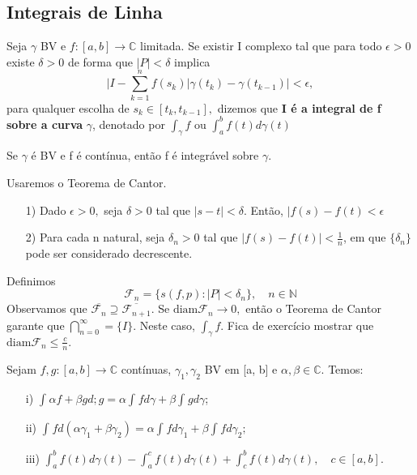 \documentclass[complex.tex]{subfiles}
\begin{document}
\subsection{Integrais de Linha}
\begin{def*}
	Seja $\gamma$ BV e $f:[a, b]\rightarrow \mathbb{C}$ limitada. Se existir I complexo tal que para todo $\epsilon > 0$ existe $\delta > 0$
	de forma que $|P| < \delta$ implica
	$$
		\biggl|I - \sum\limits_{k=1}^{n}f(s_{k})|\gamma(t_{k}) - \gamma(t_{k-1})\biggr| < \epsilon,
	$$
	para qualquer escolha de $s_{k}\in{[t_{k}, t_{k-1}]},$ dizemos que \textbf{I é a integral de f sobre a curva }$\gamma$, denotado por
	$\int_{\gamma}^{}f\text{ ou } \int_{a}^{b}f(t)d\gamma(t)$
\end{def*}
\begin{theorem*}
	Se $\gamma$ é BV e f é contínua, então f é integrável sobre $\gamma.$
\end{theorem*}
\begin{proof*}
	Usaremos o Teorema de Cantor.
	\begin{itemize}
		\item[1)] Dado $\epsilon > 0,$ seja $\delta > 0$ tal que $|s-t| < \delta.$ Então, $|f(s) - f(t) < \epsilon$
		\item[2)] Para cada n natural, seja $\delta_{n} > 0$ tal que $|f(s) - f(t)| < \frac{1}{n}$, em que $\{\delta_{n}\}$ pode ser
		      considerado decrescente.
	\end{itemize}

	Definimos
	$$
		\mathcal{F}_{n} = \{s(f, p): |P| < \delta_{n}\}, \quad n\in \mathbb{N}
	$$
	Observamos que  $\overline{\mathcal{F}_{n}}\supseteq\overline{\mathcal{F}_{n+1}}$. Se $\mathrm{diam} \mathcal{F}_{n}\to{0},$ então
	o Teorema de Cantor garante que $\bigcap_{n=0}^{\infty} = \{I\}.$ Neste caso, $\int_{\gamma}^{}f.$ Fica de exercício mostrar que
	$\mathrm{diam} \mathcal{F}_{n}\leq \frac{c}{n}.$
\end{proof*}
\begin{prop*}
	Sejam $f, g:[a, b]\rightarrow \mathbb{C}$ contínuas, $\gamma_{1}, \gamma_2$ BV em [a, b] e $\alpha, \beta\in{\mathbb{C}}.$
	Temos:
	\begin{itemize}
		\item[i)] $\int_{}^{}\alpha f + \beta g d;g = \alpha \int_{}^{}fd \gamma + \beta \int_{}^{}gd \gamma$;
		\item[ii)] $\int_{}^{}f d(\alpha \gamma_1 + \beta \gamma_2) = \alpha\int_{}^{}f d \gamma_1 + \beta \int_{}^{}f d \gamma_2;$
		\item[iii)] $\int_{a}^{b}f(t)d \gamma(t) - \int_{a}^{c}f(t)d \gamma(t) + \int_{c}^{b}f(t) d \gamma(t), \quad c\in{[a, b]}.$
	\end{itemize}
\end{prop*}
\end{document}
